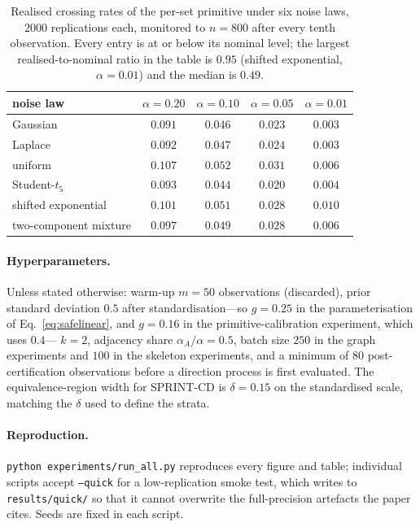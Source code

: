 \documentclass[pdflatex,sn-apa]{sn-jnl}
\theoremstyle{thmstyleone}%
\theoremstyle{thmstyletwo}%
\theoremstyle{thmstylethree}%
\begin{document}
\begin{appendices}
\begin{table}[h]
\centering
\caption{Realised crossing rates of the per-set primitive under six noise
laws, $2000$ replications each, monitored to $n = 800$ after every tenth
observation. Every entry is at or below its nominal level; the largest
realised-to-nominal ratio in the table is $0.95$ (shifted exponential,
$\alpha = 0.01$) and the median is $0.49$.}%
\label{tab:primitive}
\begin{tabular}{@{}lcccc@{}}
\toprule
noise law & $\alpha=0.20$ & $\alpha=0.10$ & $\alpha=0.05$ & $\alpha=0.01$ \\
\midrule
Gaussian            & $0.091$ & $0.046$ & $0.023$ & $0.003$ \\
Laplace             & $0.092$ & $0.047$ & $0.024$ & $0.003$ \\
uniform             & $0.107$ & $0.052$ & $0.031$ & $0.006$ \\
Student-$t_5$       & $0.093$ & $0.044$ & $0.020$ & $0.004$ \\
shifted exponential & $0.101$ & $0.051$ & $0.028$ & $0.010$ \\
two-component mixture & $0.097$ & $0.049$ & $0.028$ & $0.006$ \\
\bottomrule
\end{tabular}
\end{table}

\paragraph{Hyperparameters.} Unless stated otherwise: warm-up $m = 50$
observations (discarded), prior standard deviation $0.5$ after
standardisation---so $g = 0.25$ in the parameterisation of
Eq.~\eqref{eq:safelinear}, and $g = 0.16$ in the primitive-calibration
experiment, which uses $0.4$---
$k = 2$, adjacency share $\alpha_A/\alpha = 0.5$, batch size $250$ in the
graph experiments and $100$ in the skeleton experiments, and a minimum of $80$
post-certification observations before a direction process is first evaluated.
The equivalence-region width for SPRINT-CD is $\delta = 0.15$ on the
standardised scale, matching the $\delta$ used to define the strata.

\paragraph{Reproduction.} \texttt{python experiments/run\_all.py} reproduces
every figure and table; individual scripts accept \texttt{--quick} for a
low-replication smoke test, which writes to \texttt{results/quick/} so that it
cannot overwrite the full-precision artefacts the paper cites. Seeds are fixed
in each script.

\end{appendices}


\end{document}
